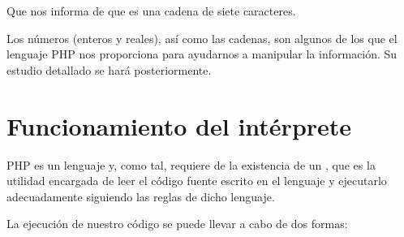 \documentclass[a4paper,12pt,spanish]{sphinxmanual}
\begin{document}
Que nos informa de que  es una cadena de siete caracteres.

\ignorespaces 
Los números (enteros y reales), así como las cadenas, son algunos de los
 que el lenguaje PHP nos proporciona para ayudarnos a
manipular la información. Su estudio detallado se hará posteriormente.


\section{Funcionamiento del intérprete}
\label{\detokenize{php:funcionamiento-del-interprete}}
PHP es un lenguaje  y, como tal, requiere de la existencia de un
, que es la utilidad encargada de leer el código fuente escrito
en el lenguaje y ejecutarlo adecuadamente siguiendo las reglas de dicho
lenguaje.

La ejecución de nuestro código se puede llevar a cabo de dos formas:
\end{document}
